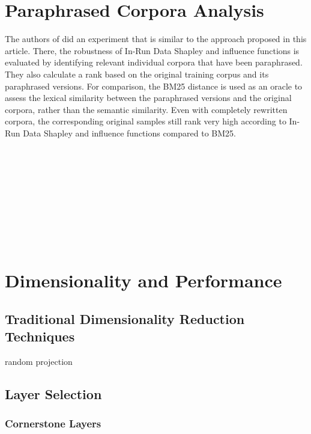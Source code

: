 \section{Paraphrased Corpora Analysis}
The authors of \cite{wang2024datashapleytrainingrun} did an experiment that is similar to the approach proposed in this article. There, the robustness of In-Run Data Shapley and influence functions is evaluated by identifying relevant individual corpora that have been paraphrased. They also calculate a rank based on the original training corpus and its paraphrased versions. For comparison, the BM25 \cite{bm25} distance is used as an oracle to assess the lexical similarity between the paraphrased versions and the original corpora, rather than the semantic similarity. Even with completely rewritten corpora, the corresponding original samples still rank very high according to In-Run Data Shapley and influence functions compared to BM25.
\\\\
\\\\
\\\\
\\\\
\\\\

\section{Dimensionality and Performance}

\subsection{Traditional Dimensionality Reduction Techniques}
random projection

\subsection{Layer Selection}

\subsubsection{Cornerstone Layers}
\cite{yeh2022betterlanguagedatainfluence}